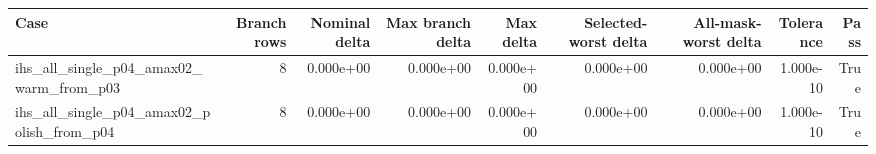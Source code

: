 \begin{tabular}{lrrrrrrrr}
\toprule
Case & Branch rows & Nominal delta & Max branch delta & Max delta & Selected-worst delta & All-mask-worst delta & Tolerance & Pass \\
\midrule
ihs\_all\_single\_p04\_amax02\_warm\_from\_p03 & 8 & 0.000e+00 & 0.000e+00 & 0.000e+00 & 0.000e+00 & 0.000e+00 & 1.000e-10 & True \\
ihs\_all\_single\_p04\_amax02\_polish\_from\_p04 & 8 & 0.000e+00 & 0.000e+00 & 0.000e+00 & 0.000e+00 & 0.000e+00 & 1.000e-10 & True \\
\bottomrule
\end{tabular}
